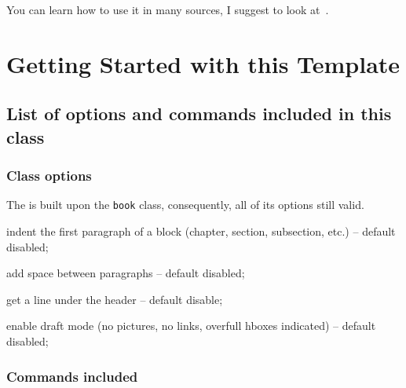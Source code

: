 You can learn how to use it in many sources, I suggest to look at~\cite{tisseau2009tikz,oetiker1995not}.


\section{Getting Started with this Template}


\subsection{List of options and commands included in this class}

\subsubsection{Class options}
The  \urmstic{} is built upon the \texttt{book} class, consequently, all of its options still valid.
 
\newcommand*{\itemt}[1]{\texttt{#1}}
\begin{description}[font=\normalfont\itemt]
	\item[indentfirst] indent the first paragraph of a  block (chapter, section, subsection, etc.) -- default disabled;
	\item[parskip] add space between paragraphs -- default disabled;
	\item[headsepline] get a line under the header -- default disable;
	\item[draft]  enable draft mode (no pictures, no links, overfull hboxes indicated) -- default disabled;
	
\end{description}

\subsubsection{Commands included}

